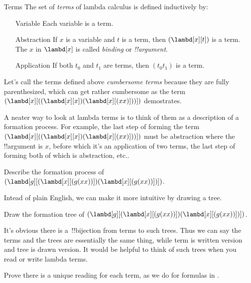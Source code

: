 \documentclass[../../../include/open-logic-section]{subfiles}
\begin{document}

\begin{defn}{Terms}
The set of \emph{terms} of lambda calculus is defined inductively by:
\begin{enumerate}
  \item[Variable] \label{form:1} Each variable is a term. 
  \item[Abstraction] \label{form:2} If $x$ is a variable and $t$ is a term, then $(\lambd[x][t])$ is
    a term. The $x$ in $\lambd[x]$ is called \emph{binding} or \emph{!!{argument}}.
  \item[Application] \label{form:3} If both $t_0$ and $t_1$ are terms, then $(t_0t_1)$ is a term.
\end{enumerate}
\end{defn}

Let's call the terms defined above \emph{cumbersome terms} because they
are fully parenthesized, which can get rather
cumbersome as the term $(\lambd[x][((\lambd[x][x])(\lambd[x][(xx)]))])$ demostrates.

A neater way to look at lambda terms is to think of them as
a description of a formation process. For
example, the last step of forming the term $(\lambd[x][((\lambd[x][x])(\lambd[x][(xx)]))])$
must be abstraction where the !!{argument} is $x$, before which it's
an application of two terms, the last step of forming both of which is
abstraction, etc.. 

\begin{prob}
  Describe the formation process of $(\lambd[g][(\lambd[x][(g (x x))]) (\lambd[x][(g (x x))])])$.
\end{prob}

Intead of plain English, we can make it more intuitive by drawing a tree. 

\begin{prob}
  Draw the formation tree of $(\lambd[g][(\lambd[x][(g (x x))]) (\lambd[x][(g (x x))])])$.
\end{prob}

It's obvious there is a~!!{bijection} from terms to such trees. Thus
we can say the terms and the trees are essentially the same thing, while
term is written version and tree is drawn version. It would be
helpful to think of such trees when you read or write lambda terms. 

\begin{prob}
  Prove there is a unique reading for each term, as we do for formulas in \olref[fol][syn][unq].
\end{prob}
\end{document}

